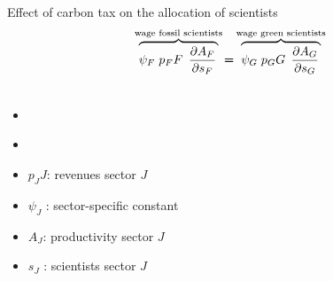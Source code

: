 \documentclass[11pt,aspectratio=169]{beamer}
\begin{document}
\begin{frame}{Effect of carbon tax on the allocation of scientists}
	\vspace{0mm}
    \large
	\begin{align*}		
		\color{black}
		\overbrace{{\psi_F} \textcolor{black!1}{\underbrace{\textcolor{black}{p_F{F}}}_{{{\tau_F\uparrow\Rightarrow\downarrow}}}}\textcolor{black!1}{\underbrace{\textcolor{black}{\frac{\partial A_{F}}{\partial s_{F}}}}_{{{s_F\downarrow\Rightarrow\uparrow}}}}}^{\text{wage fossil scientists}}{\pmb{=}}\overbrace{{\psi_G} \textcolor{black!1}{\underbrace{\textcolor{black}{p_GG}}_{{{\tau_F\uparrow\Rightarrow\uparrow}}}}\textcolor{black!1}{\underbrace{\textcolor{black}{\frac{\partial A_{G}}{\partial s_{G}}}}_{	{{s_G\uparrow\Rightarrow\downarrow}}}}}^{\text{wage green scientists}}
	\end{align*}
	\normalsize
	\begin{itemize}
		\item[] \ %
		\vspace{2mm}
		\item[] \  %
	\end{itemize}
	\small
	\vspace{4mm}
	\hspace{-2mm}
	\begin{minipage}[t!]{0.4\textwidth}
		\vspace{0mm}
		\begin{itemize}
			\item[] $p_JJ$: revenues sector $J$
			\vspace{-2mm}
			\item[] $\psi_J$ : sector-specific constant
		\end{itemize}
	\end{minipage}
	\vspace{-5mm}
	\begin{minipage}[t!]{0.5\textwidth}
		\vspace{0mm}
		\begin{itemize}	
			\item[] $A_J$: productivity sector $J$
			\vspace{-2mm}			
			\item[] $s_J$ : scientists sector $J$
		\end{itemize}
	\end{minipage}
\end{frame}
\end{document}
